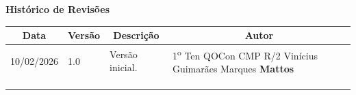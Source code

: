 \begin{table}[h]
	\begin{center}
	    \textbf{\Huge{Histórico de Revisões}}
	\end{center}
    \centering
	\begin{tabular}{|p{3cm}|p{1.5cm}|p{7.5cm}|p{3.2cm}|}
		\hline \multicolumn{1}{|c|}{\textbf{Data}} & \multicolumn{1}{|c|}{\textbf{Versão}} &
			\multicolumn{1}{|c|}{\textbf{Descrição}} & \multicolumn{1}{|c|}{\textbf{Autor}} \\ \hline
		{10/02/2026} & 1.0 & Versão inicial. & 1\textsuperscript{o} Ten QOCon CMP R/2 Vinícius Guimarães Marques \textbf{Mattos}\\ \hline
		& & & \\ \hline
		& & & \\ \hline
		& & & \\ \hline
	\end{tabular}
\end{table}
